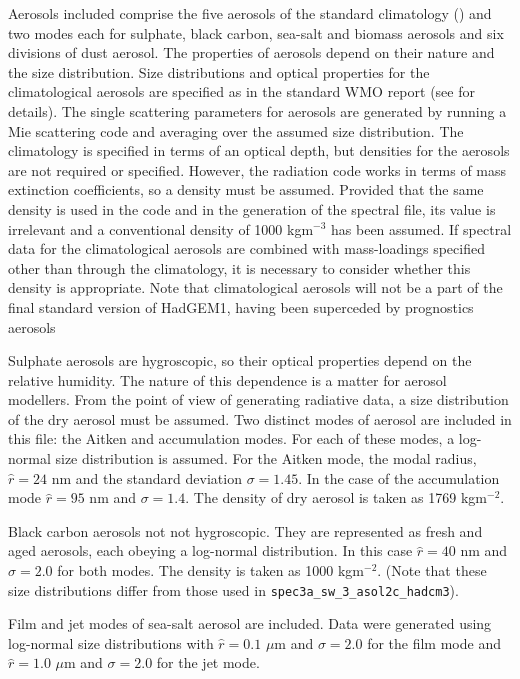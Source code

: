 Aerosols included comprise the five aerosols of the standard climatology
(\citet{Cusack98a}) and two modes each for sulphate, black carbon,
sea-salt and biomass aerosols and six divisions of dust aerosol.
The properties of aerosols depend on their nature and the size distribution.
Size distributions and optical properties for the climatological aerosols
are specified as in the standard WMO report (see \citet{Cusack98a} for
details). 
The single scattering parameters for aerosols are generated by running a 
Mie scattering code and averaging over the assumed size distribution.
The climatology is specified in terms of an optical depth, but densities
for the aerosols are not required or specified. However, the radiation
code works in terms of mass extinction coefficients, so a density must
be assumed. Provided that the same density is used in the code and in
the generation of the spectral file, its value is irrelevant and a 
conventional density of 1000 kgm$^{-3}$ has been assumed. If spectral
data for the climatological aerosols are combined with mass-loadings
specified other than through the climatology, it is necessary to
consider whether this density is appropriate. Note that climatological
aerosols will not be a part of the final standard version of HadGEM1, 
having been superceded by prognostics aerosols

Sulphate aerosols are hygroscopic, so their optical properties depend on
the relative humidity. The nature of this dependence is a matter for
aerosol modellers. From the point of view of generating radiative data,
a size distribution of the dry aerosol must be assumed. Two distinct
modes of aerosol are included in this file: the Aitken and accumulation
modes. For each of these modes, a log-normal size distribution is assumed.
For the Aitken mode, the modal radius, $\hat r = 24$ nm and the 
standard deviation $\sigma=1.45$. In the case of the accumulation mode
$\hat r = 95$ nm and $\sigma=1.4$. The density of dry aerosol is taken
as 1769 kgm${}^{-2}$.

Black carbon aerosols not not hygroscopic. They are represented as fresh
and aged aerosols, each obeying a log-normal distribution. In this case
$\hat r = 40$ nm and $\sigma=2.0$ for both modes. The density is taken
as 1000 kgm${}^{-2}$. (Note that these size distributions differ from
those used in {\tt spec3a\_sw\_3\_asol2c\_hadcm3}).

Film and jet modes of sea-salt aerosol are included. Data were generated 
using log-normal size distributions with $\hat r=0.1$ $\mu$m and
$\sigma=2.0$ for the film mode and $\hat r=1.0$ $\mu$m and $\sigma=2.0$
for the jet mode.

